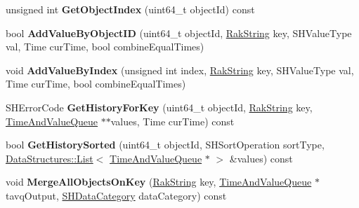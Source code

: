 \begin{DoxyCompactItemize}
\item 
\hypertarget{class_rak_net_1_1_statistics_history_a1e4fdc6e9719412901f98a12d97c0b96}{unsigned int {\bfseries Get\-Object\-Index} (uint64\-\_\-t object\-Id) const }\label{class_rak_net_1_1_statistics_history_a1e4fdc6e9719412901f98a12d97c0b96}

\item 
\hypertarget{class_rak_net_1_1_statistics_history_a246ec8aab515503ce6fea00960c23089}{bool {\bfseries Add\-Value\-By\-Object\-I\-D} (uint64\-\_\-t object\-Id, \hyperlink{class_rak_net_1_1_rak_string}{Rak\-String} key, S\-H\-Value\-Type val, Time cur\-Time, bool combine\-Equal\-Times)}\label{class_rak_net_1_1_statistics_history_a246ec8aab515503ce6fea00960c23089}

\item 
\hypertarget{class_rak_net_1_1_statistics_history_a3b1bfe8be2696ca4f6ddcf6c1ee5d44c}{void {\bfseries Add\-Value\-By\-Index} (unsigned int index, \hyperlink{class_rak_net_1_1_rak_string}{Rak\-String} key, S\-H\-Value\-Type val, Time cur\-Time, bool combine\-Equal\-Times)}\label{class_rak_net_1_1_statistics_history_a3b1bfe8be2696ca4f6ddcf6c1ee5d44c}

\item 
\hypertarget{class_rak_net_1_1_statistics_history_a0404292dc14a5b67a6bcee1b4d37c048}{S\-H\-Error\-Code {\bfseries Get\-History\-For\-Key} (uint64\-\_\-t object\-Id, \hyperlink{class_rak_net_1_1_rak_string}{Rak\-String} key, \hyperlink{struct_rak_net_1_1_statistics_history_1_1_time_and_value_queue}{Time\-And\-Value\-Queue} $\ast$$\ast$values, Time cur\-Time) const }\label{class_rak_net_1_1_statistics_history_a0404292dc14a5b67a6bcee1b4d37c048}

\item 
\hypertarget{class_rak_net_1_1_statistics_history_ab9d22addb440f5b245dd553da89683ff}{bool {\bfseries Get\-History\-Sorted} (uint64\-\_\-t object\-Id, S\-H\-Sort\-Operation sort\-Type, \hyperlink{class_data_structures_1_1_list}{Data\-Structures\-::\-List}$<$ \hyperlink{struct_rak_net_1_1_statistics_history_1_1_time_and_value_queue}{Time\-And\-Value\-Queue} $\ast$ $>$ \&values) const }\label{class_rak_net_1_1_statistics_history_ab9d22addb440f5b245dd553da89683ff}

\item 
\hypertarget{class_rak_net_1_1_statistics_history_a6f0cf5a0131a950543907aff546b0f0b}{void {\bfseries Merge\-All\-Objects\-On\-Key} (\hyperlink{class_rak_net_1_1_rak_string}{Rak\-String} key, \hyperlink{struct_rak_net_1_1_statistics_history_1_1_time_and_value_queue}{Time\-And\-Value\-Queue} $\ast$tavq\-Output, \hyperlink{class_rak_net_1_1_statistics_history_a197b0da149b5168c77891e3f9d289a0b}{S\-H\-Data\-Category} data\-Category) const }\label{class_rak_net_1_1_statistics_history_a6f0cf5a0131a950543907aff546b0f0b}


\end{DoxyCompactItemize}
